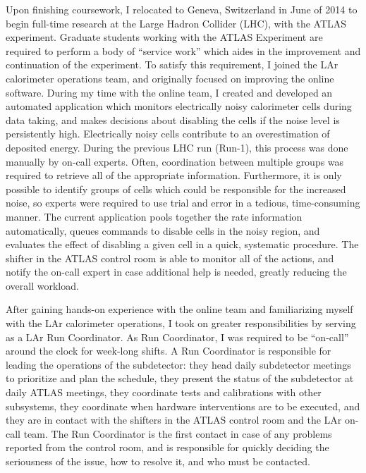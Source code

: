 Upon finishing coursework, I relocated to Geneva, Switzerland in June of 2014 to begin full-time research at the Large Hadron Collider (LHC), with the ATLAS experiment. Graduate students working with the ATLAS Experiment are required to perform a body of ``service work'' which aides in the improvement and continuation of the experiment. To satisfy this requirement, I joined the LAr calorimeter operations team, and originally focused on improving the online software. During my time with the online team, I created and developed an automated application which monitors electrically noisy calorimeter cells during data taking, and makes decisions about disabling the cells if the noise level is persistently high. Electrically noisy cells contribute to an overestimation of deposited energy. During the previous LHC run (Run-1), this process was done manually by on-call experts. Often, coordination between multiple groups was required to retrieve all of the appropriate information. Furthermore, it is only possible to identify groups of cells which could be responsible for the increased noise, so experts were required to use trial and error in a tedious, time-consuming manner. The current application pools together the rate information automatically, queues commands to disable cells in the noisy region, and evaluates the effect of disabling a given cell in a quick, systematic procedure. The shifter in the ATLAS control room is able to monitor all of the actions, and notify the on-call expert in case additional help is needed, greatly reducing the overall workload. 

After gaining hands-on experience with the online team and familiarizing myself with the LAr calorimeter operations, I took on greater responsibilities by serving as a LAr Run Coordinator. As Run Coordinator, I was required to be ``on-call'' around the clock for week-long shifts. A Run Coordinator is responsible for leading the operations of the subdetector: they head daily subdetector meetings to prioritize and plan the schedule, they present the status of the subdetector at daily ATLAS meetings, they coordinate tests and calibrations with other subsystems, they coordinate when hardware interventions are to be executed, and they are in contact with the shifters in the ATLAS control room and the LAr on-call team. The Run Coordinator is the first contact in case of any problems reported from the control room, and is responsible for quickly deciding the seriousness of the issue, how to resolve it, and who must be contacted. 

